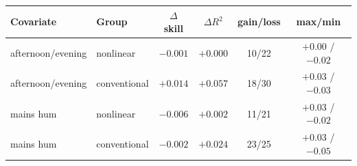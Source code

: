 \begin{tabular}{llcccc}
\toprule
Covariate & Group & $\Delta$ skill & $\Delta R^2$ & gain/loss & max/min\\
\midrule
afternoon/evening & nonlinear & $-0.001$ & $+0.000$ & 10/22 & $+0.00$ / $-0.02$\\
afternoon/evening & conventional & $+0.014$ & $+0.057$ & 18/30 & $+0.03$ / $-0.03$\\
mains hum & nonlinear & $-0.006$ & $+0.002$ & 11/21 & $+0.03$ / $-0.02$\\
mains hum & conventional & $-0.002$ & $+0.024$ & 23/25 & $+0.03$ / $-0.05$\\
\bottomrule
\end{tabular}

